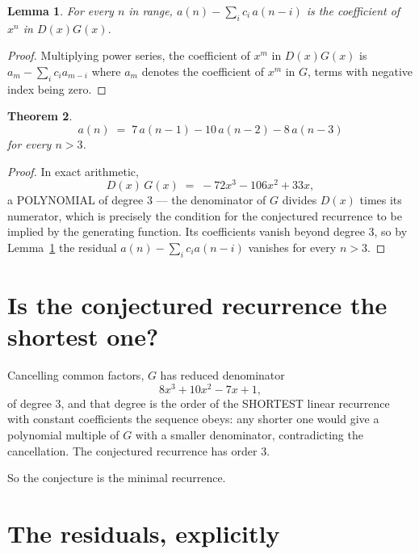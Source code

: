 \documentclass[11pt,a4paper]{article}
\theoremstyle{plain}
\newtheorem{theorem}{Theorem}
\newtheorem{lemma}[theorem]{Lemma}
\theoremstyle{definition}
\begin{document}
\begin{lemma}\label{lem:key}
For every $n$ in range, $a(n)-\sum_i c_i\,a(n-i)$ is the coefficient of $x^{n}$ in
$D(x)G(x)$.
\end{lemma}

\begin{proof}
Multiplying power series, the coefficient of $x^{m}$ in $D(x)G(x)$ is
$a_m-\sum_i c_i a_{m-i}$ where $a_m$ denotes the coefficient of $x^{m}$ in $G$, terms with
negative index being zero.
\end{proof}

\begin{theorem}
\[
a(n)\;=\;7\,a(n-1) - 10\,a(n-2) - 8\,a(n-3)
\]
for every $n>3$.
\end{theorem}

\begin{proof}
In exact arithmetic,
\[
D(x)\,G(x)\;=\;- 72 x^{3} - 106 x^{2} + 33 x,
\]
a POLYNOMIAL of degree $3$ --- the denominator of $G$ divides $D(x)$ times its numerator,
which is precisely the condition for the conjectured recurrence to be implied by the
generating function. Its coefficients vanish beyond degree $3$, so by
Lemma~\ref{lem:key} the residual $a(n)-\sum_ic_ia(n-i)$ vanishes for every
$n>3$.
\end{proof}

\section{Is the conjectured recurrence the shortest one?}

Cancelling common factors, $G$ has reduced denominator
\[
8 x^{3} + 10 x^{2} - 7 x + 1,
\]
of degree $3$, and that degree is the order of the SHORTEST linear recurrence with
constant coefficients the sequence obeys: any shorter one would give a polynomial multiple of
$G$ with a smaller denominator, contradicting the cancellation. The conjectured recurrence has
order $3$.

So the conjecture is the minimal recurrence.

\section{The residuals, explicitly}
\end{document}
